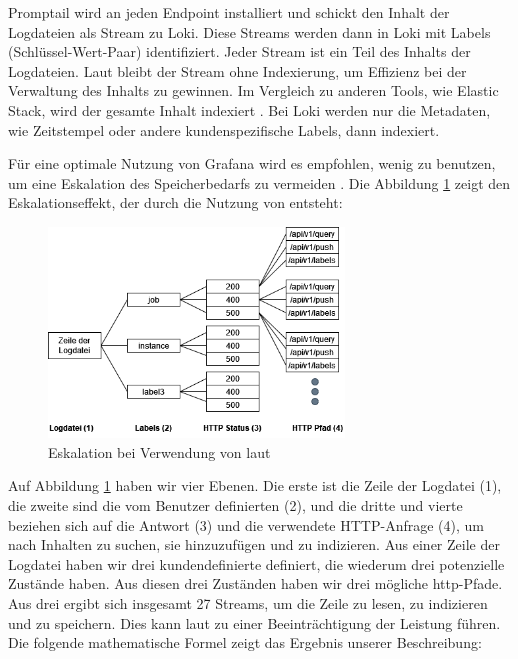 Promptail wird an jeden \gls{Endpoint} installiert und schickt den Inhalt der Logdateien als Stream zu Loki. Diese Streams werden dann in Loki mit Labels (Schlüssel-Wert-Paar) identifiziert. Jeder Stream ist ein Teil des Inhalts der Logdateien. Laut \cite{Grafana_fundamentals} bleibt der Stream ohne Indexierung, um Effizienz bei der Verwaltung des Inhalts zu gewinnen. Im Vergleich zu anderen Tools, wie Elastic Stack, wird der gesamte Inhalt indexiert \citep{Anand_LokixELK}. Bei Loki werden nur die Metadaten, wie Zeitstempel oder andere kundenspezifische Labels, dann indexiert.

Für eine optimale Nutzung von Grafana wird es empfohlen, wenig  zu benutzen, um eine Eskalation des Speicherbedarfs zu vermeiden \cite{Grafana_labels}. Die Abbildung \ref{fig:Eskalation_Labels} zeigt den Eskalationseffekt, der durch die Nutzung von  entsteht:

\begin{figure}[H]
   \centering
   \includegraphics[width=0.7\textwidth]{assets/labelstream.png}
   \caption[Eskalation bei Verwendung von ]
   {Eskalation bei Verwendung von  laut \cite{Grafana_labels}}
   \label{fig:Eskalation_Labels}
   \centering
 \end{figure}
 
Auf Abbildung \ref{fig:Eskalation_Labels} haben wir vier Ebenen. Die erste ist die Zeile der Logdatei (1), die zweite sind die vom Benutzer definierten  (2), und die dritte und vierte beziehen sich auf die Antwort (3) und die verwendete HTTP-Anfrage (4), um nach Inhalten zu suchen, sie hinzuzufügen und zu indizieren. Aus einer Zeile der Logdatei haben wir drei kundendefinierte  definiert, die wiederum drei potenzielle Zustände haben. Aus diesen drei Zuständen haben wir drei mögliche \gls{http}-Pfade. Aus drei  ergibt sich insgesamt 27 Streams, um die Zeile zu lesen, zu indizieren und zu speichern. Dies kann laut \cite{Grafana_labels} zu einer Beeinträchtigung der Leistung führen. Die folgende mathematische Formel zeigt das Ergebnis unserer Beschreibung:

